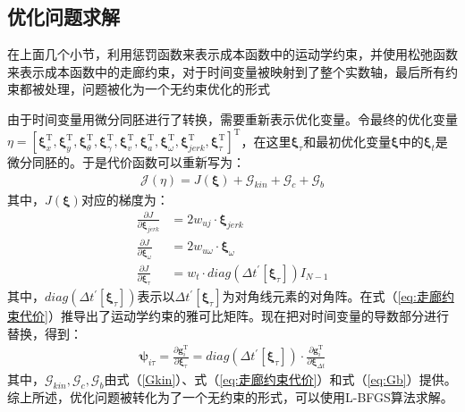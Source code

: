 \documentclass[master,academic]{ysuthesis} %
\begin{document}
		\subsection{优化问题求解}
		在上面几个小节，利用惩罚函数来表示成本函数中的运动学约束，并使用松弛函数来表示成本函数中的走廊约束，对于时间变量被映射到了整个实数轴，最后所有约束都被处理，问题被化为一个无约束优化的形式

		由于时间变量用微分同胚进行了转换，需要重新表示优化变量。令最终的优化变量$\eta =\left[ \bm{\xi} _{x}^{\mathrm{T}},\bm{\xi} _{y}^{\mathrm{T}},\bm{\xi} _{\theta}^{\mathrm{T}},\bm{\xi} _{\gamma}^{\mathrm{T}},\bm{\xi} _{v}^{\mathrm{T}},\bm{\xi} _{a}^{\mathrm{T}},\bm{\xi} _{\omega}^{\mathrm{T}},\bm{\xi} _{jerk}^{\mathrm{T}},\bm{\xi} _{\tau}^{\mathrm{T}} \right] ^{\mathrm{T}}$，在这里$\bm{\xi} _{\tau}$和最初优化变量$\bm{\xi}$中的$\bm{\xi} _{t}$是微分同胚的。于是代价函数可以重新写为：
		\begin{equation}
			\begin{aligned}
				\mathcal{J}\left( \eta \right) =J\left( \bm{\xi} \right) +\mathcal{G}_{kin}+\mathcal{G}_c+\mathcal{G}_b
			\end{aligned}
		\end{equation}
		其中，$J(\bm{\xi})$对应的梯度为：
		\begin{equation}
			\begin{aligned}
				\frac{\partial J}{\partial \bm{\xi} _{jerk}}&=2w_{uj}\cdot \bm{\xi} _{jerk}\\
				\frac{\partial J}{\partial \bm{\xi} _{\omega}}&=2w_{u\omega}\cdot \bm{\xi} _{\omega}\\
				\frac{\partial J}{\partial \bm{\xi} _{\tau}}&=w_t\cdot diag(\Delta t^{'}\left[ \bm{\xi} _{\tau} \right])I_{N-1}
			\end{aligned}
		\end{equation}
		其中，$diag(\Delta t^{'}\left[ \bm{\xi} _{\tau} \right])$表示以$\Delta t^{'}\left[ \bm{\xi} _{\tau} \right]$为对角线元素的对角阵。在式（\ref{eq:走廊约束代价}）推导出了运动学约束的雅可比矩阵。现在把对时间变量的导数部分进行替换，得到：
		\begin{equation}
			\begin{aligned}
				\bm{\psi} _{i\tau}=\frac{\partial \bm{g}_{i}^{\mathrm{T}}}{\partial \bm{\xi} _{\tau}}=diag(\Delta t^{'}\left[ \bm{\xi} _{\tau} \right])\cdot \frac{\partial \bm{g}_{i}^{\mathrm{T}}}{\partial \bm{\xi} _{\Delta t}}
			\end{aligned}
		\end{equation}
		其中，$\mathcal{G}_{kin},\mathcal{G}_c,\mathcal{G}_b$由式（\ref{Gkin}）、式（\ref{eq:走廊约束代价}）和式（\ref{eq:Gb}）提供。
		综上所述，优化问题被转化为了一个无约束的形式，可以使用L-BFGS算法求解。
\end{document}

